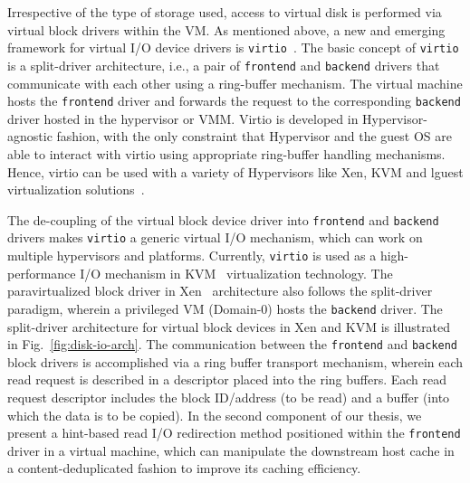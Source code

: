 Irrespective of the type of storage used, access to virtual disk is
performed via virtual block drivers within the VM. 
As mentioned above, a new and emerging framework for 
virtual I/O device drivers is \texttt{virtio}~\cite{virtio}. 
The basic concept of \texttt{virtio} is a split-driver
architecture, i.e., a pair of \texttt{frontend} 
and \texttt{backend} drivers that communicate with each other using
a ring-buffer mechanism.
The virtual machine hosts the \texttt{frontend} driver and forwards the
request to the corresponding \texttt{backend} driver hosted in the 
hypervisor or VMM.
Virtio is developed in Hypervisor-agnostic fashion, with the only
constraint that Hypervisor and the guest OS are able to interact
with virtio using appropriate ring-buffer handling mechanisms.
Hence, virtio can be used
with a variety of Hypervisors like Xen, KVM and lguest virtualization 
solutions~\cite{virtio}.

The de-coupling of the virtual block device driver 
into \texttt{frontend} and \texttt{backend} drivers
makes \texttt{virtio}
a generic virtual I/O mechanism, which can work on multiple hypervisors
and platforms. Currently, \texttt{virtio} is used as a high-performance
I/O mechanism in KVM~\cite{kvm} virtualization technology. 
The paravirtualized block driver in Xen~\cite{xen} architecture also follows
the split-driver paradigm, wherein a privileged VM (Domain-0) hosts the 
\texttt{backend} driver. The split-driver architecture for virtual block devices
in Xen and KVM is illustrated in Fig.~\ref{fig:disk-io-arch}.
The communication between the \texttt{frontend} and \texttt{backend} block drivers is 
accomplished via a ring buffer transport mechanism, wherein each read
request is described in a descriptor placed into the ring buffers. Each
read request descriptor includes the block ID/address (to be read) and a 
buffer (into which the data is to be copied). 
In the second component of our thesis, we present a hint-based read
I/O redirection method positioned within the \texttt{frontend}
driver in a virtual machine, which can manipulate the downstream 
host cache in a content-deduplicated
fashion to improve its caching efficiency.

